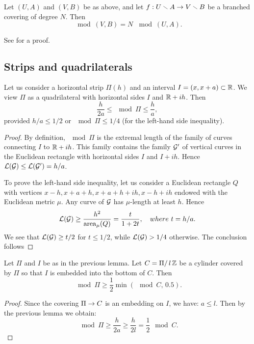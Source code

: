 \begin{lem}\label{modulus transform-1}
Let $(U,A)$ and $(V,B)$ be as above,
and let  $f: U\smallsetminus A\rightarrow V\smallsetminus B$ be a branched covering of degree $N$. Then
$$
      \mod(V, B)= N\, \mod (U,  A).
$$
\end{lem}

See \cite{A} for a proof.



\subsection{Strips and quadrilaterals}

\begin{lem}\label{Pi}
 Let us consider a horizontal strip $\Pi(h)$
and an interval $I=(x, x+a)\subset {\Bbb R}$. We view $\Pi$ as a
quadrilateral with horizontal sides $I$ and ${\Bbb R}+ih$.
Then
$$
      \frac{h}{2a}\leq  \mod \Pi \leq \frac{h}{a},
$$
provided $h/a\leq 1/2$ or $\mod\Pi \leq 1/4$ (for the left-hand side inequality).
\end{lem}

\begin{proof}
  By definition, $\mod\Pi$ is the extremal length of the family of curves connecting
$I$ to  ${\Bbb R}+ih$. This family contains the family ${\mathcal G}'$ of vertical curves
in the Euclidean rectangle with horizontal sides $I$ and $I+ih$.
Hence ${\mathcal L}({\mathcal G})\leq {\mathcal L}({\mathcal G}')=h/a$.

To prove the left-hand side inequality, let us consider a Euclidean rectangle
$Q$ with vertices $x-h, x+a+h, x+a+h+ih, x-h+ih$ endowed with the Euclidean metric $\mu$.
Any curve of ${\mathcal G}$ has $\mu$-length at least $h$. Hence
$$
  {\mathcal L}({\mathcal G})\geq \frac{h^2}{\operatorname{area}_\mu(Q)}= \frac{t}{1+2t}, \quad where\ t=h/a.
$$
We see that ${\mathcal L}({\mathcal G})\geq t/2$ for $t\leq 1/2$,
 while ${\mathcal L}({\mathcal G}) >  1/4$ otherwise. The conclusion follows
\end{proof}


\begin{lem}\label{C}
Let $\Pi$ and $I$ be as in the previous lemma.
Let $C= \Pi/\, l\,{\Bbb Z} $
be a cylinder covered by $\Pi$
so that $I$ is embedded into the bottom of $C$.
Then
$$
      \mod \Pi  \geq \frac{1}{2} \min(\mod C,\, 0.5).
$$
\end{lem}

\begin{proof}
Since the covering $\Pi\rightarrow C$ is an embedding on $I$, we have: $a\leq l$.
 Then by the previous lemma we obtain:
$$
    \mod \Pi \geq \frac{h}{2a} \geq \frac {h}{2l}= \frac{1}{2} \mod C.
$$
\end{proof}



